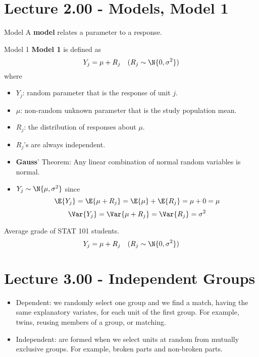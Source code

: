 \section{Lecture 2.00 - Models, Model 1}
\begin{Definition}{Model}{}
    A \textbf{model} relates a parameter to a response.
\end{Definition}
\begin{Definition}{Model 1}{}
    \textbf{Model 1} is defined as
    \[ Y_j=\mu+R_j\quad(R_j\sim\N{0,\sigma^2}) \]
    where
    \begin{itemize}
        \item $ Y_j $: random parameter that is the response of unit $ j $.
        \item $ \mu $: non-random unknown parameter that is the study population mean.
        \item $ R_j $: the distribution of responses about $ \mu $.
    \end{itemize}
\end{Definition}
\begin{Remark}{}{}
    \begin{itemize}
        \item $ R_j $'s are always independent.
        \item \textbf{Gauss}' Theorem: Any linear combination of
              normal random variables is normal.
        \item $ Y_j\sim\N{\mu,\sigma^2} $ since
              \[ \E{Y_j}=\E{\mu+R_j}=\E{\mu}+\E{R_j}=\mu+0=\mu \]
              \[ \Var{Y_j}=\Var{\mu+R_j}=\Var{R_j}=\sigma^2 \]
    \end{itemize}
\end{Remark}
\begin{Example}{}{}
    Average grade of STAT 101 students.
    \[ Y_j=\mu+R_j\quad(R_j\sim\N{0,\sigma^2}) \]
\end{Example}

\section{Lecture 3.00 - Independent Groups}
\begin{itemize}
    \item Dependent: we randomly select one group and
          we find a match, having the same explanatory variates, for
          each unit of the first group. For example, twins, reusing
          members of a group, or matching.
    \item Independent: are formed when we select units at random
          from mutually exclusive groups. For example, broken parts
          and non-broken parts.
\end{itemize}

